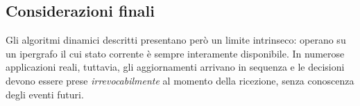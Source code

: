 \subsection*{Considerazioni finali}

Gli algoritmi dinamici descritti presentano però un limite intrinseco: operano su un ipergrafo il cui stato corrente è sempre interamente disponibile.
In numerose applicazioni reali, tuttavia, gli aggiornamenti arrivano in sequenza e le decisioni devono essere prese \emph{irrevocabilmente} al momento della ricezione, senza conoscenza degli eventi futuri.